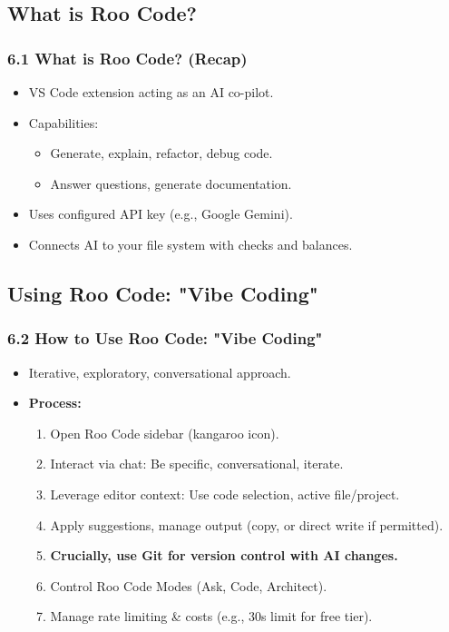 \documentclass{beamer}
\begin{document}
\subsection{What is Roo Code?}
\begin{frame}
  \frametitle{6.1 What is Roo Code? (Recap)}
  \begin{itemize}
    \item VS Code extension acting as an AI co-pilot.
    \item Capabilities:
    \begin{itemize}
        \item Generate, explain, refactor, debug code.
        \item Answer questions, generate documentation.
    \end{itemize}
    \item Uses configured API key (e.g., Google Gemini).
    \item Connects AI to your file system with checks and balances.
  \end{itemize}
\end{frame}

\subsection{Using Roo Code: "Vibe Coding"}
\begin{frame}
  \frametitle{6.2 How to Use Roo Code: "Vibe Coding"}
  \begin{itemize}
    \item Iterative, exploratory, conversational approach.
    \item \textbf{Process:}
    \begin{enumerate}
        \item Open Roo Code sidebar (kangaroo icon).
        \item Interact via chat: Be specific, conversational, iterate.
        \item Leverage editor context: Use code selection, active file/project.
        \item Apply suggestions, manage output (copy, or direct write if permitted).
        \item \textbf{Crucially, use Git for version control with AI changes.}
        \item Control Roo Code Modes (Ask, Code, Architect).
        \item Manage rate limiting \& costs (e.g., 30s limit for free tier).
    \end{enumerate}
  \end{itemize}
\end{frame}
\end{document}
